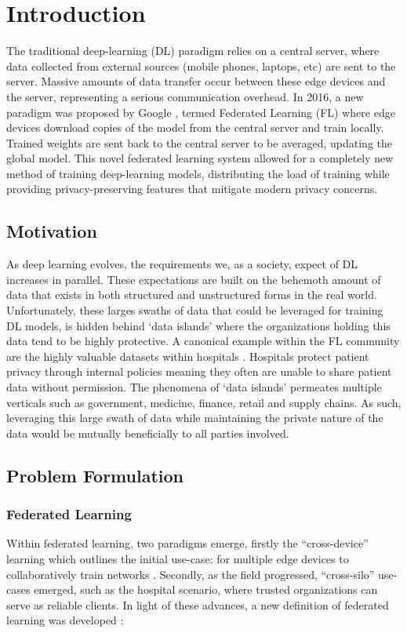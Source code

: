 \chapter{Introduction }\label{ch:intro} 
The traditional deep-learning (DL) paradigm relies on a central server, where data collected from external sources (mobile phones, laptops, etc) are sent to the server. Massive amounts of data transfer occur between these edge devices and the server, representing a serious communication overhead. In 2016, a new paradigm was proposed by Google \cite{konevcny2016federated}, termed Federated Learning (FL) where edge devices download copies of the model from the central server and train locally. Trained weights are sent back to the central server to be averaged, updating the global model. This novel federated learning system allowed for a completely new method of training deep-learning models, distributing the load of training while providing privacy-preserving features that mitigate modern privacy concerns. \\

\section{Motivation}
As deep learning evolves, the requirements we, as a society, expect of DL increases in parallel. These expectations are built on the behemoth amount of data that exists in both structured and unstructured forms in the real world. Unfortunately, these larges swaths of data that could be leveraged for training DL models, is hidden behind `data islands' where the organizations holding this data tend to be highly protective. A canonical example within the FL community are the highly valuable datasets within hospitals \cite{li2021flsurvey}. Hospitals protect patient privacy through internal policies meaning they often are unable to share patient data without permission. The phenomena of `data islands' permeates multiple verticals such as government, medicine, finance, retail and supply chains. As such, leveraging this large swath of data while maintaining the private nature of the data would be mutually beneficially to all parties involved. \\


\section{Problem Formulation}
\subsection{Federated Learning}\label{ch:fedlearn}
Within federated learning, two paradigms emerge, firstly the ``cross-device'' learning which outlines the initial use-case: for multiple edge devices to collaboratively train networks \cite{konevcny2016federated}. Secondly, as the field progressed, ``cross-silo'' use-cases emerged, such as the hospital scenario, where trusted organizations can serve as reliable clients. In light of these advances, a new definition of federated learning was developed \cite{kairouz2019advances}:



